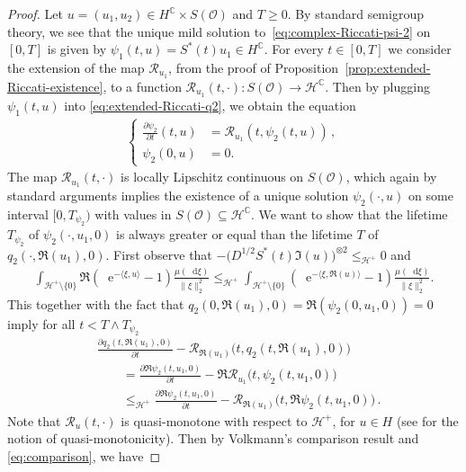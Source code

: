 \documentclass[10pt,a4paper,reqno]{amsart}
\newcommand*\D{\mathop{}\!\mathrm{d}}
\newcommand*\E{\mathop{}\!\mathrm{e}}
\numberwithin{equation}{section}
\theoremstyle{plain}
\theoremstyle{definition}
\theoremstyle{example}
\newcommand{\MC}{\mathbb{C}}
\newcommand{\cH}{\mathcal{H}}
\newcommand{\cO}{\mathcal{O}}
\newcommand{\cR}{\mathcal{R}}
\newcommand{\norm}[1]{\|#1\|}
\newcommand{\cHplus}{\cH^{+}}
\newcommand{\cHpluso}{\cHplus\setminus \{0\}}
\begin{document}
\begin{proof}
  Let $u=(u_{1},u_{2})\in H^{\MC}\times S(\cO)$ and $T\geq
  0$. By standard semigroup theory, we see that the unique mild solution
  to~\eqref{eq:complex-Riccati-psi-2} on $[0,T]$ is given by
  $\psi_1(t,u)=S^{*}(t)u_{1}\in H^{\MC}$. For every $t\in [0,T]$ we consider 
the extension of the map $\cR_{u_{1}}$, from the proof of
  Proposition~\ref{prop:extended-Riccati-existence}, to a function $\cR_{u_1}
  (t, \cdot)\colon S(\cO)\to \cH^\MC$. Then by plugging
  $\psi_{1}(t,u)$ into \eqref{eq:extended-Riccati-q2}, we obtain the equation 
  \begin{align}\label{eq:extended-Riccati-q-2-1}
    \begin{cases}
    \frac{\partial \psi_{2}}{\partial t}(t,u)&= \cR_{u_1}(t,\psi_2(t,u))\,,\\
    \psi_{2}(0,u)&=0.
    \end{cases}
  \end{align}
  The map $\mathcal{R}_{u_{1}}(t,\cdot)$ is locally Lipschitz continuous on
  $S(\cO)$, which again by standard arguments implies the existence
  of a unique solution $\psi_{2}(\cdot,u)$ on some interval
  $[0,T_{\psi_{2}})$ with values in $S(\mathcal{O})\subseteq\cH^{\MC}$. We
  want to show that the lifetime $T_{\psi_{2}}$ of $\psi_{2}(\cdot, u_1, 0)$
  is always greater or equal than the lifetime 
  $T$ of $q_{2}(\cdot,\Re(u_1),0)$. 
  First observe that
  $-\big( D^{1/2}S^{*}(t)\Im(u))^{\otimes 2}\leq_{\cHplus} 0$ and 
  \begin{align*}
    \int_{\cHpluso}\Re (\E^{-\langle \xi , u\rangle } -1) \frac{\mu(\D\xi)}{\norm{\xi}_2^{2}}\leq_{\cHplus} \int_{\cHpluso}(\E^{-\langle \xi , \Re{(u)}\rangle } -1)\frac{\mu(\D\xi)}{\norm{\xi}_2^{2}}.
  \end{align*}
  This together with the fact that $q_{2}(0,\Re(u_1),0)=\Re(\psi_{2}(0,u_1,0))=0$ imply for all $t<T\wedge T_{\psi_{2}}$
  \begin{align}\label{eq:comparison}
   & \frac{\partial
    q_{2}(t,\Re(u_1),0)}{\partial t}-\cR_{\Re(u_{1})}\big(t,q_{2}(t,\Re(u_1),0)\big)\nonumber\\
    &\qquad =\frac{\partial \Re\psi_{2}(t,u_1,0)}{\partial t}-\Re \cR_{u_{1}}\big(t,\psi_{2}(t,u_1,0)\big)\nonumber\\ 
    &\qquad  \leq_{\cHplus} \frac{\partial \Re\psi_{2}(t,u_1,0)}{\partial t}-\cR_{\Re(u_{1})}\big(t,\Re\psi_{2}(t,u_1,0)\big)\,.
  \end{align}
 Note that $\cR_u(t, \cdot)$ is quasi-monotone with respect to $\cH^+$, for $u\in H$ (see \cite[Section 6]{Vol73} for the notion of quasi-monotonicity). Then by Volkmann's comparison result \cite[Satz 2]{Vol73} and \eqref{eq:comparison}, we have

\end{proof}
\end{document}
